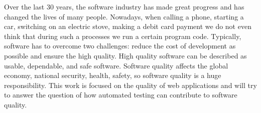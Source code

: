 Over the last 30 years, the software industry has made great progress and has changed the lives of many people. Nowadays, when calling a phone, starting a car, switching on an electric stove, making a debit card payment we do not even think that during such a processes we run a certain program code. Typically, software has to overcome two challenges: reduce the cost of development as possible and ensure the high quality. High quality software can be described as usable, dependable, and safe software. Software quality affects the global economy, national security, health, safety, so software quality is a huge responsibility. This work is focused on the quality of web applications and will try to answer the question of how automated testing can contribute to software quality.